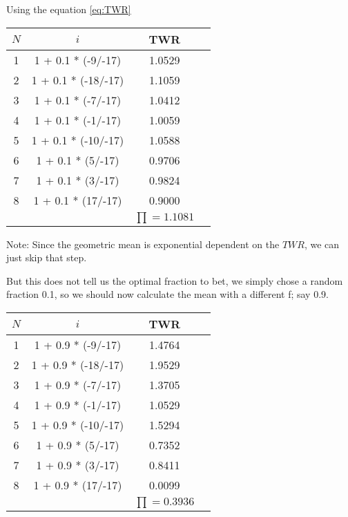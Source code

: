 \documentclass[12pt]{article}
\begin{document}
    Using the equation \ref{eq:TWR}

    \begin{center}
    \begin{tabular}{ |c|c|c|c| } 
     \hline
        \(N\) & \(i\) & TWR \\
        \hline
        1 & 1 + 0.1 * (-9/-17)  & 1.0529 \\
        2 & 1 + 0.1 * (-18/-17) & 1.1059 \\
        3 & 1 + 0.1 * (-7/-17)  & 1.0412 \\
        4 & 1 + 0.1 * (-1/-17)  & 1.0059 \\
        5 & 1 + 0.1 * (-10/-17) & 1.0588 \\
        6 & 1 + 0.1 * (5/-17)   & 0.9706 \\
        7 & 1 + 0.1 * (3/-17)   & 0.9824 \\
        8 & 1 + 0.1 * (17/-17)  & 0.9000 \\
        \hline
        & & \(\prod = 1.1081\)\\
     \hline
    \end{tabular}
    \end{center}

    Note: Since the geometric mean is exponential dependent on the \(TWR\), we can just skip that
    step.

    But this does not tell us the optimal fraction to bet, we simply chose a random fraction 
    0.1, so we should now calculate the mean with a different f; say 0.9.

    \begin{center}
    \begin{tabular}{ |c|c|c|c| } 
     \hline
        \(N\) & \(i\) & TWR \\
        \hline
        1 & 1 + 0.9 * (-9/-17)  & 1.4764 \\
        2 & 1 + 0.9 * (-18/-17) & 1.9529 \\
        3 & 1 + 0.9 * (-7/-17)  & 1.3705 \\
        4 & 1 + 0.9 * (-1/-17)  & 1.0529 \\
        5 & 1 + 0.9 * (-10/-17) & 1.5294 \\
        6 & 1 + 0.9 * (5/-17)   & 0.7352 \\
        7 & 1 + 0.9 * (3/-17)   & 0.8411 \\
        8 & 1 + 0.9 * (17/-17)  & 0.0099 \\
        \hline
        & & \(\prod = 0.3936\)\\
     \hline
    \end{tabular}
    \end{center}
\end{document}
